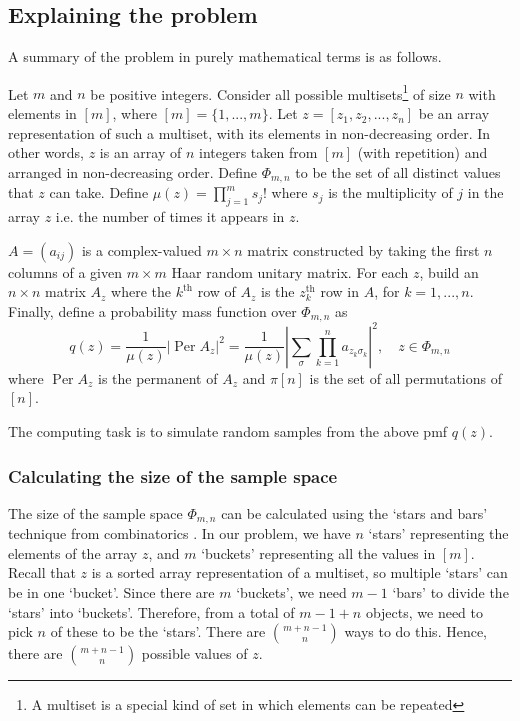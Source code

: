 \documentclass[11pt]{article}
\theoremstyle{theorem}
\theoremstyle{theorem}
\theoremstyle{remark}
\theoremstyle{note}
\theoremstyle{plain}
\theoremstyle{definition}
\DeclareMathOperator*{\Per}{\mathrm{Per}}
\begin{document}
\subsection{Explaining the problem}
A summary of the problem in purely mathematical terms is as follows. 

Let $m$ and $n$ be positive integers. Consider all possible multisets\footnote{A multiset is a special kind of set in which elements can be repeated} of size $n$ with elements in $[m]$, where $[m] = \{1, ... , m\}$. Let $z = [z_1, z_2, ... , z_n]$ be an array representation of such a multiset, with its elements in non-decreasing order. In other words, $z$ is an array of $n$ integers taken from $[m]$ (with repetition) and arranged in non-decreasing order. Define $\Phi_{m,n}$ to be the set of all distinct values that $z$ can take. Define $\mu(z) = \prod_{j=1}^m s_j !$ where $s_j$ is the multiplicity of $j$ in the array $z$ i.e. the number of times it appears in $z$.

$A = (a_{ij})$ is a complex-valued $m \times n$ matrix constructed by taking the first $n$ columns of a given $m \times m$ Haar random unitary matrix. For each $z$, build an $n \times n$ matrix $A_z$ where the $k^{\text{th}}$ row of $A_z$ is the $z_k^{\text{th}}$ row in $A$, for $k = 1, ... , n$. Finally, define a probability mass function over $\Phi_{m,n}$  as
\begin{equation}\label{boson_sampling_formula1}
q (z) = \frac{1}{\mu(z)} \left|\Per A_z \right| ^2 = \frac{1}{\mu(z)}  \left|\sum_{\sigma} \prod_{k=1}^n a_{z_k \sigma_k}\right|^2, \quad z \in \Phi_{m,n}
\end{equation}
where $\Per A_z$ is the permanent of $A_z$ and $\pi[n]$ is the set of all permutations of $[n]$.

The computing task is to simulate random samples from the above pmf $q(z)$.
\subsubsection{Calculating the size of the sample space}
The size of the sample space $ \Phi_{m,n}$ can be calculated using the `stars and bars' technique from combinatorics \cite{feller1968}. In our problem, we have $n$ `stars' representing the elements of the array $z$, and $m$ `buckets' representing all the values in $[m]$. Recall that $z$ is a sorted array representation of a multiset, so multiple `stars' can be in one `bucket'. Since there are $m$ `buckets', we need $m-1$ `bars' to divide the `stars' into `buckets'. Therefore, from a total of $m-1 + n$ objects, we need to pick $n$ of these to be the `stars'. There are $\binom{m+n-1}{n}$ ways to do this. Hence, there are $\binom{m+n-1}{n}$ possible values of $z$.
\end{document}
